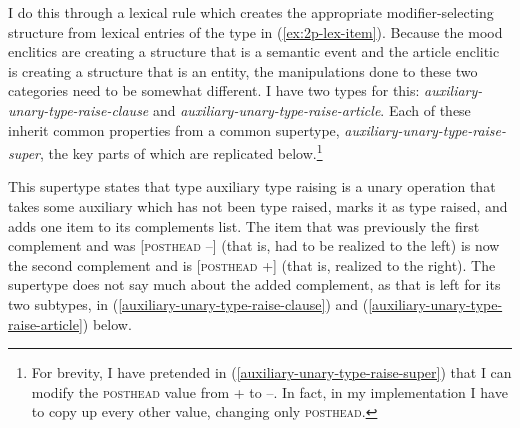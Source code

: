 I do this through a lexical rule which creates the appropriate modifier-selecting structure from lexical entries of the type in (\ref{ex:2p-lex-item}). Because the mood enclitics are creating a structure that is a semantic event and the article enclitic is creating a structure that is an entity, the manipulations done to these two categories need to be somewhat different. I have two types for this: {\textit{auxiliary-unary-type-raise-clause}} and {\textit{auxiliary-unary-type-raise-article}}. Each of these inherit common properties from a common supertype, {\textit{auxiliary-unary-type-raise-super}}, the key parts of which are replicated below.\footnote{For brevity, I have pretended in (\ref{auxiliary-unary-type-raise-super}) that I can modify the \textsc{posthead} value from + to --. In fact, in my implementation I have to copy up every other value, changing only \textsc{posthead}.}

\begin{singlespacing}
\ex \label{auxiliary-unary-type-raise-super}
\xe
\end{singlespacing}

This supertype states that type auxiliary type raising is a unary operation that takes some auxiliary which has not been type raised, marks it as type raised, and adds one item to its complements list. The item that was previously the first complement and was [\textsc{posthead} --] (that is, had to be realized to the left) is now the second complement and is [\textsc{posthead} +] (that is, realized to the right). The supertype does not say much about the added complement, as that is left for its two subtypes, in (\ref{auxiliary-unary-type-raise-clause}) and (\ref{auxiliary-unary-type-raise-article}) below.

